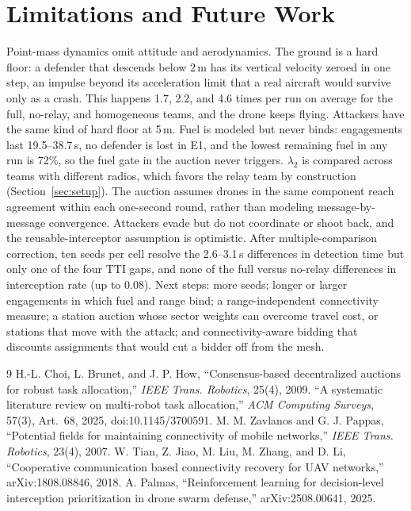 \documentclass[10pt,twocolumn]{article}
\begin{document}
\section{Limitations and Future Work}
\label{sec:limits}
Point-mass dynamics omit attitude and aerodynamics. The ground is a hard
floor: a defender that descends below 2\,m has its vertical velocity zeroed
in one step, an impulse beyond its acceleration limit that a real aircraft
would survive only as a crash. This happens 1.7, 2.2, and 4.6 times per run
on average for the full, no-relay, and homogeneous teams, and the drone
keeps flying. Attackers have the same kind of hard floor at 5\,m. Fuel is modeled but never binds: engagements last
19.5--38.7\,s, no defender is lost in E1, and the lowest remaining fuel in
any run is 72\%, so the fuel gate in the auction never triggers.
$\lambda_2$ is compared across teams with different radios, which favors
the relay team by construction (Section~\ref{sec:setup}). The auction assumes
drones in the same component reach agreement within each one-second round,
rather than modeling message-by-message convergence. Attackers evade but do
not coordinate or shoot back, and the reusable-interceptor assumption is
optimistic. After multiple-comparison correction, ten seeds per cell
resolve the 2.6--3.1\,s differences in detection time but only one of the
four TTI gaps, and none of the full versus no-relay differences in
interception rate (up to 0.08). Next
steps: more seeds; longer or larger engagements in which fuel and range
bind; a range-independent connectivity measure; a station auction
whose sector weights can overcome travel cost, or stations that move with
the attack; and connectivity-aware bidding that discounts
assignments that would cut a bidder off from the mesh.


\begin{thebibliography}{9}
 H.-L. Choi, L. Brunet, and J. P. How, ``Consensus-based
decentralized auctions for robust task allocation,'' \emph{IEEE Trans.
Robotics}, 25(4), 2009.
 ``A systematic literature review on multi-robot task
allocation,'' \emph{ACM Computing Surveys}, 57(3), Art.~68, 2025,
doi:10.1145/3700591.
 M. M. Zavlanos and G. J. Pappas, ``Potential fields for
maintaining connectivity of mobile networks,'' \emph{IEEE Trans. Robotics},
23(4), 2007.
 W. Tian, Z. Jiao, M. Liu, M. Zhang, and D. Li,
``Cooperative communication based connectivity recovery for UAV networks,''
arXiv:1808.08846, 2018.
 A. Palmas, ``Reinforcement learning for
decision-level interception prioritization in drone swarm defense,''
arXiv:2508.00641, 2025.
\end{thebibliography}
\end{document}
